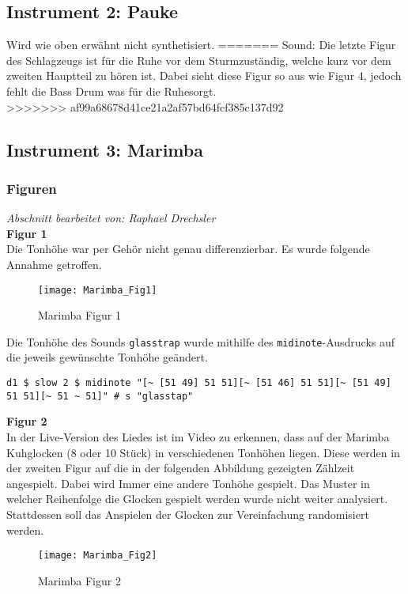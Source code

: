 \documentclass[
10pt, %
a4paper, %
oneside, %
headinclude,footinclude, %
BCOR5mm, %
]{scrartcl}
\begin{document}
\subsection{Instrument 2: Pauke}
Wird wie oben erwähnt nicht synthetisiert.
=======
Sound: Die letzte Figur des Schlagzeugs ist für \glqq die Ruhe vor dem Sturm\grqq zuständig, welche kurz vor dem zweiten Hauptteil zu hören ist. Dabei sieht diese Figur so aus
wie Figur 4, jedoch fehlt die Bass Drum was für die \glqq Ruhe\grqq sorgt.\\
>>>>>>> af99a68678d41ce21a2af57bd64fcf385c137d92

\subsection{Instrument 3: Marimba}
\subsubsection{Figuren}
\textit{Abschnitt bearbeitet von: Raphael Drechsler}\\

\noindent \textbf{Figur 1}\\
Die Tonhöhe war per Gehör nicht genau differenzierbar. Es wurde folgende Annahme getroffen.
\begin{figure}[h]
	\centering 
	\texttt{[image: Marimba\_Fig1]} 
	\caption{Marimba Figur 1}
\end{figure}

\noindent Die Tonhöhe des Sounds \verb|glasstrap| wurde mithilfe des \verb|midinote|-Ausdrucks \cite{tid6} auf die jeweils gewünschte Tonhöhe geändert.
\begin{lstlisting}
d1 $ slow 2 $ midinote "[~ [51 49] 51 51][~ [51 46] 51 51][~ [51 49] 51 51][~ 51 ~ 51]" # s "glasstap"
\end{lstlisting}


\noindent \textbf{Figur 2}\\
In der Live-Version des Liedes ist im Video zu erkennen, dass auf der Marimba Kuhglocken (8 oder 10 Stück) in verschiedenen Tonhöhen liegen. Diese werden in der zweiten Figur auf die in der folgenden Abbildung gezeigten Zählzeit angespielt. Dabei wird Immer eine andere Tonhöhe gespielt. Das Muster in welcher Reihenfolge die Glocken gespielt werden wurde nicht weiter analysiert. Stattdessen soll das Anspielen der Glocken zur Vereinfachung randomisiert werden.
\begin{figure}[h]
	\centering 
	\texttt{[image: Marimba\_Fig2]} 
	\caption{Marimba Figur 2}
\end{figure}
\end{document}
